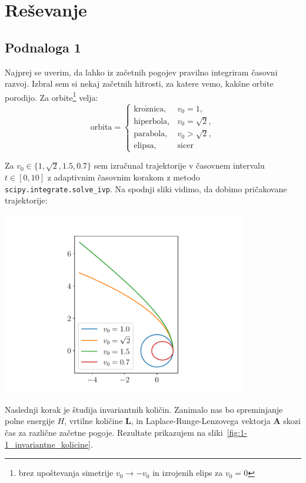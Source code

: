 \section{Reševanje}
\subsection{Podnaloga 1}
Najprej se uverim, da lahko iz začetnih pogojev pravilno integriram časovni
razvoj. Izbral sem si nekaj začetnih hitrosti, za katere vemo, kakšne orbite
porodijo. Za orbite\footnote{brez upoštevanja simetrije $v_0 \rightarrow - v_0$
    in izrojenih elips za $v_0 = 0$} velja:
\[
    \mathrm{orbita}=\begin{cases}
        \mathrm{kro\check{z}nica}, & v_0 = 1,        \\
        \mathrm{hiperbola},        & v_0 = \sqrt{2}, \\
        \mathrm{parabola},         & v_0 > \sqrt{2}, \\
        \mathrm{elipsa},           & \mathrm{sicer}
    \end{cases}
\]
\begin{samepage}
    Za \(v_0 \in \{ 1, \sqrt{2}, 1.5, 0.7 \}\) sem izračunal trajektorije v
    časovnem intervalu $ t\in\left[ 0, 10\right] $ z adaptivnim časovnim korakom
    z metodo \texttt{scipy.integrate.solve\_ivp}. Na spodnji sliki vidimo, da
    dobimo pričakovane trajektorije:

    \begin{center}
        \centering
        \includegraphics[width=0.8\textwidth]{../images/1-1-v0.pdf}
    \end{center}
\end{samepage}

Naslednji korak je študija invariantnih količin. Zanimalo nas bo spreminjanje
polne energije $H$, vrtilne količine $\mathbf{L}$,  in Laplace-Runge-Lenzovega
vektorja $\mathbf{A}$ skozi čas za različne začetne pogoje. Rezultate prikazujem
na sliki~\ref{fig:1-1_invariantne_kolicine}.

